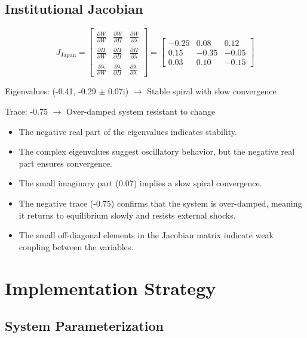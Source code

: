 \documentclass[10pt]{article}
\theoremstyle{definition}
\begin{document}
\subsection{Institutional Jacobian}

\begin{equation}
J_{\text{Japan}} = \begin{bmatrix}
\frac{\partial \dot{W}}{\partial W} & \frac{\partial \dot{W}}{\partial \Pi} & \frac{\partial \dot{W}}{\partial \lambda} \\
\frac{\partial \dot{\Pi}}{\partial W} & \frac{\partial \dot{\Pi}}{\partial \Pi} & \frac{\partial \dot{\Pi}}{\partial \lambda} \\
\frac{\partial \dot{\lambda}}{\partial W} & \frac{\partial \dot{\lambda}}{\partial \Pi} & \frac{\partial \dot{\lambda}}{\partial \lambda}
\end{bmatrix} = \begin{bmatrix}
-0.25 & 0.08 & 0.12 \\
0.15 & -0.35 & -0.05 \\
0.03 & 0.10 & -0.15
\end{bmatrix}
\end{equation}

Eigenvalues: (-0.41, -0.29 $\pm$ 0.07i) $\rightarrow$ Stable spiral with slow convergence

Trace: -0.75 $\rightarrow$ Over-damped system resistant to change

\begin{itemize}
    \item The negative real part of the eigenvalues indicates stability.
    \item The complex eigenvalues suggest oscillatory behavior, but the negative real part ensures convergence.
    \item The small imaginary part (0.07) implies a slow spiral convergence.
    \item The negative trace (-0.75) confirms that the system is over-damped, meaning it returns to equilibrium slowly and resists external shocks.
    \item The small off-diagonal elements in the Jacobian matrix indicate weak coupling between the variables.
\end{itemize}

\section{Implementation Strategy}
\subsection{System Parameterization}
\end{document}
